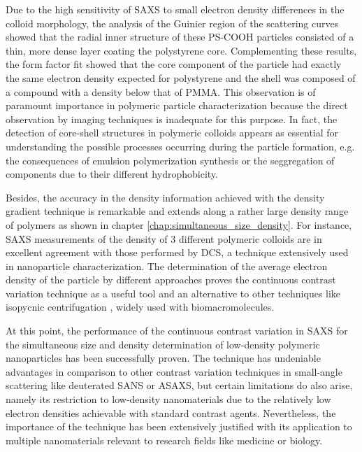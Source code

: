 Due to the high sensitivity of SAXS to small electron density differences in the colloid morphology, the analysis of the Guinier region of the scattering curves showed that the radial inner structure of these PS-COOH particles consisted of a thin, more dense layer coating the polystyrene core. Complementing these results, the form factor fit showed that the core component of the particle had exactly the same electron  density expected for polystyrene and the shell was composed of a compound with a density below that of PMMA. This observation is of paramount importance in polymeric particle characterization because the direct observation by imaging techniques is inadequate for this purpose. In fact, the detection of core-shell structures in polymeric colloids appears as essential for understanding the possible processes occurring during the particle formation, e.g. the consequences of emulsion polymerization synthesis or the seggregation of components due to their different hydrophobicity.

Besides, the accuracy in the density information achieved with the density gradient technique is remarkable and extends along a rather large density range of polymers as shown in chapter \ref{chap:simultaneous_size_density}. For instance, SAXS measurements of the density of 3 different polymeric colloids are in excellent agreement with those performed by DCS, a technique extensively used in nanoparticle characterization. The determination of the average electron density of the particle by different approaches proves the continuous contrast variation technique as a useful tool and an alternative to other techniques like isopycnic centrifugation \citep{vauthier_measurement_1999,arnold_sorting_2006,sun_separation_2009}, widely used with biomacromolecules. 

At this point, the performance of the continuous contrast variation in SAXS for the simultaneous size and density determination of low-density polymeric nanoparticles has been successfully proven. The technique has undeniable advantages in comparison to other contrast variation techniques in small-angle scattering like deuterated SANS or ASAXS, but certain limitations do also arise, namely its restriction to low-density nanomaterials due to the relatively low electron densities achievable with standard contrast agents. Nevertheless, the importance of the technique has been extensively justified with its application to multiple nanomaterials relevant to research fields like medicine or biology.

